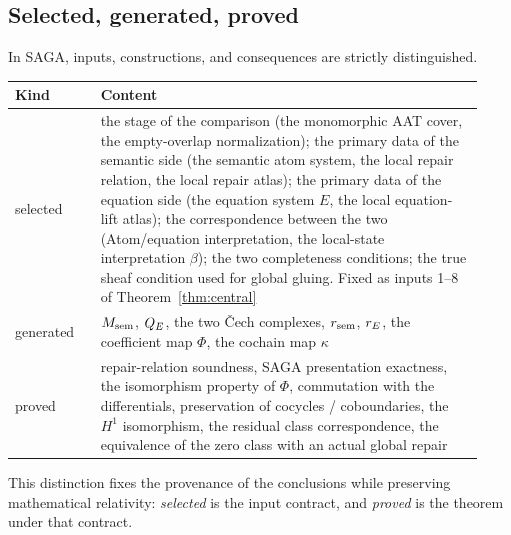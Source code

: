 \subsection{Selected, generated, proved}\label{sec:38}

In SAGA, inputs, constructions, and consequences are strictly
distinguished.

\begin{center}
\small
\begin{tabular}{@{}p{0.17\linewidth}p{0.76\linewidth}@{}}
\toprule
Kind & Content \\
\midrule
selected &
the stage of the comparison (the monomorphic AAT cover, the
empty-overlap normalization); the primary data of the semantic side (the
semantic atom system, the local repair relation, the local repair
atlas); the primary data of the equation side (the equation system $E$,
the local equation-lift atlas); the correspondence between the two
(Atom/equation interpretation, the local-state interpretation $\beta$);
the two completeness conditions; the true sheaf condition used for
global gluing. Fixed as inputs 1--8 of Theorem~\ref{thm:central} \\
\addlinespace
generated &
$M_{\mathrm{sem}}$, $Q_{E}$, the two \v{C}ech complexes, $r_{\mathrm{sem}}$, $r_{E}$, the
coefficient map $\Phi$, the cochain map $\kappa$ \\
\addlinespace
proved &
repair-relation soundness, SAGA presentation exactness, the isomorphism
property of $\Phi$, commutation with the differentials, preservation of cocycles /
coboundaries, the $H^1$ isomorphism, the residual class correspondence,
the equivalence of the zero class with an actual global repair \\
\bottomrule
\end{tabular}
\end{center}

This distinction fixes the provenance of the conclusions while
preserving mathematical relativity: \emph{selected} is the input
contract, and \emph{proved} is the theorem under that contract.
